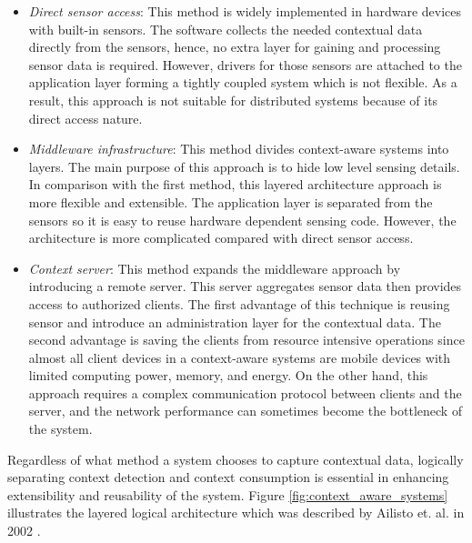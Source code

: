 \begin{itemize}
    \item \textit{Direct sensor access}: This method is widely implemented in hardware devices with built-in sensors. The software collects the needed contextual data directly from the sensors, hence, no extra layer for gaining and processing sensor data is required. However, drivers for those sensors are attached to the application layer forming a tightly coupled system which is not flexible. As a result, this approach is not suitable for distributed systems because of its direct access nature.
    \item \textit{Middleware infrastructure}: This method divides context-aware systems into layers. The main purpose of this approach is to hide low level sensing details. In comparison with the first method, this layered architecture approach is more flexible and extensible. The application layer is separated from the sensors so it is easy to reuse hardware dependent sensing code. However, the architecture is more complicated compared with direct sensor access.

    \item \textit{Context server}: This method expands the middleware approach by introducing a remote server. This server aggregates sensor data then provides access to authorized clients. The first advantage of this technique is reusing sensor and introduce an administration layer for the contextual data. The second advantage is saving the clients from resource intensive operations since almost all client devices in a context-aware systems are mobile devices with limited computing power, memory, and energy. On the other hand, this approach requires a complex communication protocol between clients and the server, and the network performance can sometimes become the bottleneck of the system.
\end{itemize}

Regardless of what method a system chooses to capture contextual data, logically separating context detection and context consumption is essential in enhancing extensibility and reusability of the system. Figure \ref{fig:context_aware_systems} illustrates the layered logical architecture which was described by Ailisto et. al. in 2002 \cite{ailisto2002structuring}.

